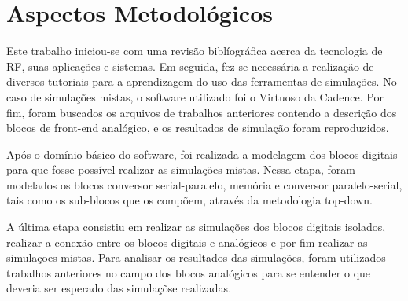 \section{Aspectos Metodológicos}

Este trabalho iniciou-se com uma revisão biblíográfica acerca da tecnologia de RF, suas aplicações e sistemas. Em seguida, fez-se necessária a realização de diversos tutoriais para a aprendizagem do uso das ferramentas de simulações. No caso de simulações mistas, o software utilizado foi o Virtuoso da Cadence. Por fim, foram buscados os arquivos de trabalhos anteriores contendo a descrição dos blocos de front-end analógico, e os resultados de simulação foram reproduzidos.

Após o domínio básico do software, foi realizada a modelagem dos blocos digitais para que fosse possível realizar as simulações mistas. Nessa etapa, foram modelados os blocos conversor serial-paralelo, memória e conversor paralelo-serial, tais como os sub-blocos que os compõem, através da metodologia top-down.

A última etapa consistiu em realizar as simulações dos blocos digitais isolados, realizar a conexão entre os blocos digitais e analógicos e por fim realizar as simulaçoes mistas. Para analisar os resultados das simulações, foram utilizados trabalhos anteriores no campo dos blocos analógicos para se entender o que deveria ser esperado das simulaçõse realizadas.